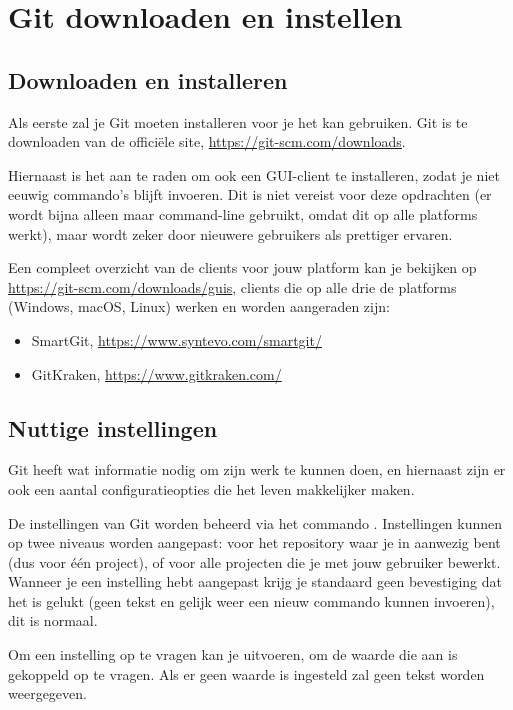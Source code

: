 \section{Git downloaden en instellen}

\subsection{Downloaden en installeren}
Als eerste zal je Git moeten installeren voor je het kan gebruiken. Git is te
downloaden van de offici\"ele site, \url{https://git-scm.com/downloads}.

Hiernaast is het aan te raden om ook een GUI-client te installeren, zodat je
niet eeuwig commando's blijft invoeren. Dit is niet vereist voor deze opdrachten
(er wordt bijna alleen maar command-line gebruikt, omdat dit op alle platforms
werkt), maar wordt zeker door nieuwere gebruikers als prettiger ervaren.

Een compleet overzicht van de clients voor jouw platform kan je bekijken op
\url{https://git-scm.com/downloads/guis}, clients die op alle drie de platforms
(Windows, macOS, Linux) werken en worden aangeraden zijn:

\begin{itemize}
	\item SmartGit, \url{https://www.syntevo.com/smartgit/}
	\item GitKraken, \url{https://www.gitkraken.com/}
\end{itemize}

\subsection{Nuttige instellingen}
Git heeft wat informatie nodig om zijn werk te kunnen doen, en hiernaast zijn er
ook een aantal configuratieopties die het leven makkelijker maken.

De instellingen van Git worden beheerd via het commando .
Instellingen kunnen op twee niveaus worden aangepast: voor het repository waar
je in aanwezig bent (dus voor \'e\'en project), of voor alle projecten die je
met jouw gebruiker bewerkt. Wanneer je een instelling hebt aangepast krijg je
standaard geen bevestiging dat het is gelukt (geen tekst en gelijk weer
een nieuw commando kunnen invoeren), dit is normaal.

Om een instelling op te vragen kan je 
uitvoeren, om de waarde die aan  is gekoppeld op te vragen. Als
er geen waarde is ingesteld zal geen tekst worden weergegeven.

